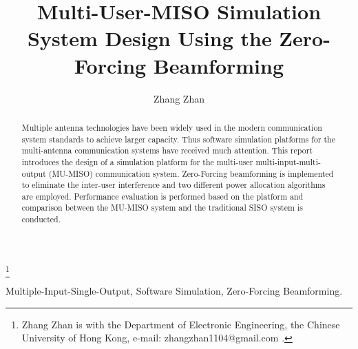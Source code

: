 \documentclass[journal,comsoc]{IEEEtran}
\begin{document}

%
\title{Multi-User-MISO Simulation System Design Using the Zero-Forcing Beamforming}
%
%
%

\author{Zhang Zhan}%
\thanks{Zhang Zhan is with the Department
of Electronic Engineering, the Chinese University of Hong Kong, e-mail: zhangzhan1104@gmail.com .}%

\maketitle

\begin{abstract}
  Multiple antenna technologies have been widely used in the modern communication system standards to achieve larger capacity.
  Thus software simulation platforms for the multi-antenna communication systems have received much attention.
  This report introduces the design of a simulation platform for the multi-user multi-input-multi-output (MU-MISO) communication system.
  Zero-Forcing beamforming is implemented to eliminate the inter-user interference and two different power allocation algorithms are employed.
  Performance evaluation is performed based on the platform and comparison between the MU-MISO system and the traditional SISO system is conducted.
\end{abstract}

\begin{IEEEkeywords}
Multiple-Input-Single-Output, Software Simulation, Zero-Forcing Beamforming.
\end{IEEEkeywords}
\end{document}
